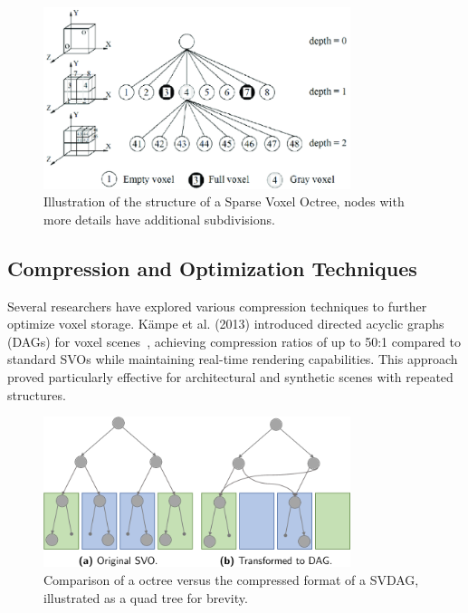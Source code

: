 \begin{figure}[thp]
    \begin{center}
        \includegraphics[width=0.8\textwidth]{figures/svo.png}
    \end{center}
    \caption{Illustration of the structure of a Sparse Voxel Octree, nodes with more details have additional
    subdivisions.~\protect\cite{truong2014octree}}
\end{figure}

\subsection{Compression and Optimization Techniques}
Several researchers have explored various compression techniques to further optimize voxel storage. Kämpe et al. (2013)
introduced directed acyclic graphs (DAGs) for voxel scenes~\cite{kampe2013high}, achieving compression ratios of up to
50:1 compared to standard SVOs while maintaining real-time rendering capabilities. This approach proved particularly
effective for architectural and synthetic scenes with repeated structures.

\begin{figure}[thp]
    \begin{center}
        \includegraphics[width=0.8\textwidth]{figures/svdag.png}
    \end{center}
    \caption{Comparison of a octree versus the compressed format of a SVDAG, illustrated as a quad tree for brevity.
    \protect\cite{dolonius2018sparse}}
\end{figure}

